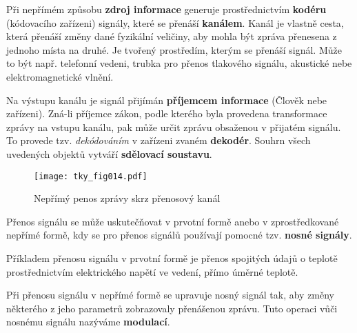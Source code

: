       Při nepřímém způsobu \textbf{zdroj informace} generuje prostřednictvím \textbf{kodéru} 
      (kódovacího zařízeni) signály, které se přenáší \textbf{kanálem}. Kanál je vlastně cesta, 
      která přenáší změny dané fyzikální veličiny, aby mohla být zpráva přenesena z jednoho místa 
      na druhé. Je tvořený prostředím, kterým se přenáší signál. Může to být např. telefonní 
      vedeni, trubka pro přenos tlakového signálu, akustické nebe elektromagnetické vlnění.
      
      Na výstupu kanálu je signál přijímán \textbf{příjemcem informace} (Člověk nebe zařízeni). 
      Zná-li příjemce zákon, podle kterého byla provedena transformace zprávy na vstupu kanálu, pak 
      může určit zprávu obsaženou v přijatém signálu. To provede tzv. \emph{dekódováním} v zařízeni 
      zvaném \textbf{dekodér}. Souhrn všech uvedených objektů vytváří \textbf{sdělovací soustavu}.

      \begin{figure}[ht!]
        \centering
        \texttt{[image: tky\_fig014.pdf]}
        \caption{Nepřímý penos zprávy skrz přenosový kanál}
        \label{tky:fig014}
      \end{figure}

      Přenos signálu se může uskutečňovat v prvotní formě anebo v zprostředkované nepřímé formě, 
      kdy se pro přenos signálů používají pomocné tzv. \textbf{nosné signály}.
      
      Příkladem přenosu signálu v prvotní formě je přenos spojitých údajů o teplotě     
      prostřednictvím elektrického napětí ve vedení, přímo úměrné teplotě. 
      
      Při přenosu signálu v nepřímé formě se upravuje nosný signál tak, aby změny některého z jeho 
      parametrů zobrazovaly přenášenou zprávu. Tuto operaci vůči nosnému signálu nazýváme 
      \textbf{modulací}.